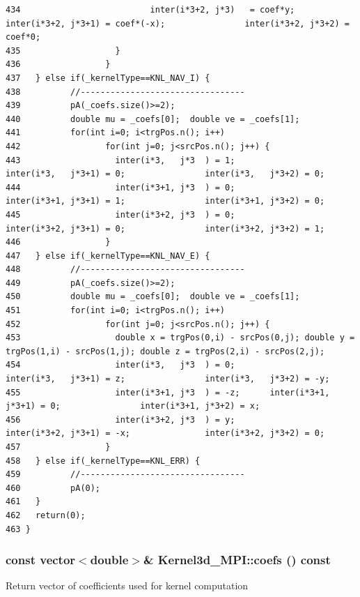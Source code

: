 \begin{verbatim}
434                          inter(i*3+2, j*3)   = coef*y;                   inter(i*3+2, j*3+1) = coef*(-x);                inter(i*3+2, j*3+2) = coef*0;
435                   }
436                 }
437   } else if(_kernelType==KNL_NAV_I) {
438          //---------------------------------
439          pA(_coefs.size()>=2);
440          double mu = _coefs[0];  double ve = _coefs[1];
441          for(int i=0; i<trgPos.n(); i++)
442                 for(int j=0; j<srcPos.n(); j++) {
443                   inter(i*3,   j*3  ) = 1;               inter(i*3,   j*3+1) = 0;                inter(i*3,   j*3+2) = 0;
444                   inter(i*3+1, j*3  ) = 0;               inter(i*3+1, j*3+1) = 1;                inter(i*3+1, j*3+2) = 0;
445                   inter(i*3+2, j*3  ) = 0;               inter(i*3+2, j*3+1) = 0;                inter(i*3+2, j*3+2) = 1;
446                 }
447   } else if(_kernelType==KNL_NAV_E) {
448          //---------------------------------
449          pA(_coefs.size()>=2);
450          double mu = _coefs[0];  double ve = _coefs[1];
451          for(int i=0; i<trgPos.n(); i++)
452                 for(int j=0; j<srcPos.n(); j++) {
453                   double x = trgPos(0,i) - srcPos(0,j); double y = trgPos(1,i) - srcPos(1,j); double z = trgPos(2,i) - srcPos(2,j);
454                   inter(i*3,   j*3  ) = 0;               inter(i*3,   j*3+1) = z;                inter(i*3,   j*3+2) = -y;
455                   inter(i*3+1, j*3  ) = -z;      inter(i*3+1, j*3+1) = 0;                inter(i*3+1, j*3+2) = x;
456                   inter(i*3+2, j*3  ) = y;               inter(i*3+2, j*3+1) = -x;               inter(i*3+2, j*3+2) = 0;
457                 }
458   } else if(_kernelType==KNL_ERR) {
459          //---------------------------------
460          pA(0);
461   }
462   return(0);
463 }
\end{verbatim}\normalsize 


\subsubsection{\setlength{\rightskip}{0pt plus 5cm}const vector$<$double$>$\& Kernel3d\_\-MPI::coefs () const\hspace{0.3cm}{\tt  [inline]}}\label{classKernel3d__MPI_869ed9e1e4e4eba94ef7ffba3a3d82a9_869ed9e1e4e4eba94ef7ffba3a3d82a9}


Return vector of coefficients used for kernel computation 

